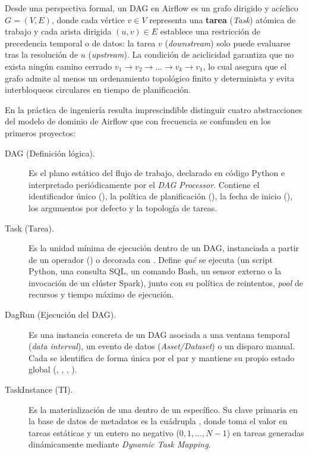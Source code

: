Desde una perspectiva formal, un DAG en Airflow es un grafo dirigido y acíclico $G = (V, E)$, donde cada vértice $v \in V$ representa una \textbf{tarea} (\textit{Task}) atómica de trabajo y cada arista dirigida $(u, v) \in E$ establece una restricción de precedencia temporal o de datos: la tarea $v$ (\textit{downstream}) solo puede evaluarse tras la resolución de $u$ (\textit{upstream}). La condición de aciclicidad garantiza que no exista ningún camino cerrado $v_1 \rightarrow v_2 \rightarrow \dots \rightarrow v_k \rightarrow v_1$, lo cual asegura que el grafo admite al menos un ordenamiento topológico finito y determinista y evita interbloqueos circulares en tiempo de planificación.

En la práctica de ingeniería resulta imprescindible distinguir cuatro abstracciones del modelo de dominio de Airflow que con frecuencia se confunden en los primeros proyectos:

\begin{description}
  \item[DAG (Definición lógica).] Es el plano estático del flujo de trabajo, declarado en código Python e interpretado periódicamente por el \textit{DAG Processor}. Contiene el identificador único (), la política de planificación (), la fecha de inicio (), los argumentos por defecto y la topología de tareas.
  \item[Task (Tarea).] Es la unidad mínima de ejecución dentro de un DAG, instanciada a partir de un operador () o decorada con . Define \textit{qué} se ejecuta (un script Python, una consulta SQL, un comando Bash, un sensor externo o la invocación de un clúster Spark), junto con su política de reintentos, \textit{pool} de recursos y tiempo máximo de ejecución.
  \item[DagRun (Ejecución del DAG).] Es una instancia concreta de un DAG asociada a una ventana temporal (\textit{data interval}), un evento de datos (\textit{Asset/Dataset}) o un disparo manual. Cada  se identifica de forma única por el par  y mantiene su propio estado global (, , , ).
  \item[TaskInstance (TI).] Es la materialización de una  dentro de un  específico. Su clave primaria en la base de datos de metadatos es la cuádrupla , donde  toma el valor  en tareas estáticas y un entero no negativo ($0, 1, \dots, N-1$) en tareas generadas dinámicamente mediante \textit{Dynamic Task Mapping}.
\end{description}

